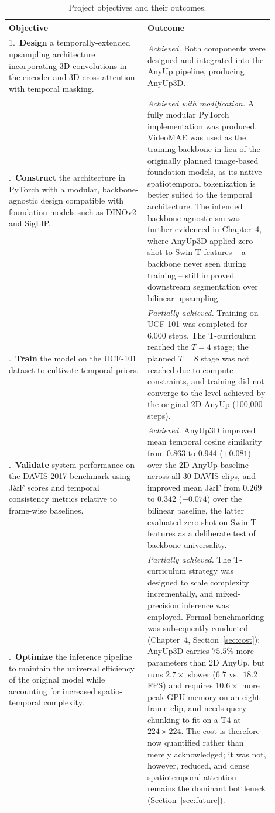 \small
\begin{longtable}{p{0.47\linewidth} p{0.43\linewidth}}
\caption{Project objectives and their outcomes.}
\label{tab:objectives}\\
\toprule
\textbf{Objective} & \textbf{Outcome} \\
\midrule
1.\ \textbf{Design} a temporally-extended upsampling architecture incorporating 3D convolutions in the encoder and 3D cross-attention with temporal masking. &
\textit{Achieved.} Both components were designed and integrated into the AnyUp pipeline, producing AnyUp3D. \\
\addlinespace
2.\ \textbf{Construct} the architecture in PyTorch with a modular, backbone-agnostic design compatible with foundation models such as DINOv2 and SigLIP. &
\textit{Achieved with modification.} A fully modular PyTorch implementation was produced. VideoMAE was used as the training backbone in lieu of the originally planned image-based foundation models, as its native spatiotemporal tokenization is better suited to the temporal architecture. The intended backbone-agnosticism was further evidenced in Chapter~4, where AnyUp3D applied zero-shot to Swin-T features -- a backbone never seen during training -- still improved downstream segmentation over bilinear upsampling. \\
\addlinespace
3.\ \textbf{Train} the model on the UCF-101 dataset to cultivate temporal priors. &
\textit{Partially achieved.} Training on UCF-101 was completed for 6{,}000 steps. The T-curriculum reached the $T\!=\!4$ stage; the planned $T\!=\!8$ stage was not reached due to compute constraints, and training did not converge to the level achieved by the original 2D AnyUp (100{,}000 steps). \\
\addlinespace
4.\ \textbf{Validate} system performance on the DAVIS-2017 benchmark using J\&F scores and temporal consistency metrics relative to frame-wise baselines. &
\textit{Achieved.} AnyUp3D improved mean temporal cosine similarity from $0.863$ to $0.944$ ($+0.081$) over the 2D AnyUp baseline across all 30 DAVIS clips, and improved mean J\&F from $0.269$ to $0.342$ ($+0.074$) over the bilinear baseline, the latter evaluated zero-shot on Swin-T features as a deliberate test of backbone universality. \\
\addlinespace
5.\ \textbf{Optimize} the inference pipeline to maintain the universal efficiency of the original model while accounting for increased spatio-temporal complexity. &
\textit{Partially achieved.} The T-curriculum strategy was designed to scale complexity incrementally, and mixed-precision inference was employed. Formal benchmarking was subsequently conducted (Chapter~4, Section~\ref{sec:cost}): AnyUp3D carries $75.5\%$ more parameters than 2D AnyUp, but runs $2.7\times$ slower ($6.7$ vs.\ $18.2$\,FPS) and requires $10.6\times$ more peak GPU memory on an eight-frame clip, and needs query chunking to fit on a T4 at $224 \times 224$. The cost is therefore now quantified rather than merely acknowledged; it was not, however, reduced, and dense spatiotemporal attention remains the dominant bottleneck (Section~\ref{sec:future}). \\
\bottomrule
\end{longtable}
\normalsize


